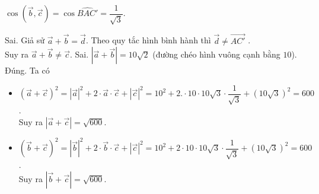 \begin{ex}
{		$\cos \left( \overrightarrow{b}, \overrightarrow{c} \right)=\cos \widehat{BAC'}=\dfrac{1}{\sqrt{3}}$.
		\begin{itemchoice}
			\itemch Sai. Giả sử $\overrightarrow{a} + \overrightarrow{b} = \overrightarrow{d}$. Theo quy tắc hình bình hành thì $\overrightarrow{d} \ne \overrightarrow{AC'}$ .\\
			Suy ra $\overrightarrow{a} + \overrightarrow{b} \ne \overrightarrow{c}$.
			\itemch Sai. $\left| \overrightarrow{a} + \overrightarrow{b} \right|= 10\sqrt{2}$ (đường chéo hình vuông cạnh bằng $10$).
			\itemch Đúng. Ta có
			\begin{itemize}
				\item $\left(\overrightarrow{a} + \overrightarrow{c} \right)^2 = \left| \overrightarrow{a} \right|^2 + 2 \cdot \overrightarrow{a} \cdot \overrightarrow{c} + \left| \overrightarrow{c} \right|^2 = 10^2+2.  \cdot 10 \cdot 10\sqrt{3} \cdot \dfrac{1}{\sqrt{3}} + \left( 10\sqrt{3} \right)^2 = 600$.\\
				Suy ra $\left| \overrightarrow{a}+\overrightarrow{c} \right| = \sqrt{600}$.\\
				\item $\left( \overrightarrow{b} + \overrightarrow{c} \right)^2 = \left| \overrightarrow{b} \right|^2 + 2 \cdot \overrightarrow{b} \cdot \overrightarrow{c} + \left| \overrightarrow{c} \right|^2 =10^2 + 2 \cdot 10 \cdot 10 \sqrt{3} \cdot \dfrac{1}{\sqrt{3}} + \left( 10\sqrt{3} \right)^2=600$.\\
				Suy ra $\left|\overrightarrow{b}+\overrightarrow{c}\right|=\sqrt{600}$.\\
			\end{itemize}
			

\end{itemchoice}}
\end{ex}
